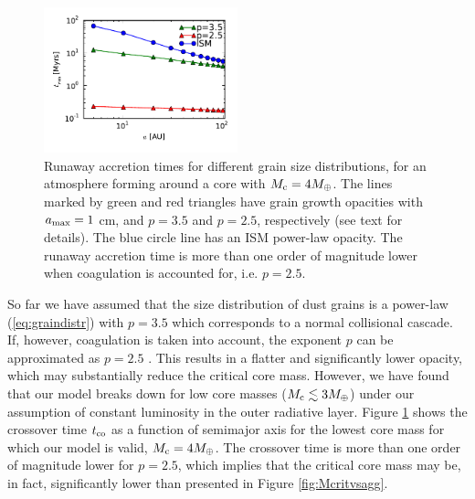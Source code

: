 \documentclass[apj]{emulateapj}
\newcommand{\co}{_{\rm c}}
\begin{document}
\begin{figure}[h!]
\centering
\includegraphics[width=0.5\textwidth]{../../figs/ModelAtmospheres/RadSelfGravRealEOS/PaperFigs/tco_vs_a_Mc4_comp.pdf}
\caption{Runaway accretion times for different grain size distributions, for an atmosphere forming around a core with $M\co=4 M_{\oplus}$. The lines marked by green and red triangles have grain growth opacities with $a_{\rm max}=1$ cm, and $p=3.5$ and $p=2.5$, respectively (see text for details). The blue circle line has an ISM power-law opacity. The runaway accretion time is more than one order of magnitude lower when coagulation is accounted for, i.e. $p=2.5$.}
\label{fig:p25p35}
\end{figure}

So far we have assumed that the size distribution of dust grains is a power-law (\ref{eq:graindistr}) with $p=3.5$ which corresponds to a normal collisional cascade. If, however, coagulation is taken into account, the exponent $p$ can be approximated as $p=2.5$ \citep{dalessio01}. This results in a flatter and significantly lower opacity, which may substantially reduce the critical core mass. However, we have found that our model breaks down for low core masses ($M\co \lesssim 3 M_{\oplus}$) under our assumption of constant luminosity in the outer radiative layer. Figure \ref{fig:p25p35} shows the crossover time $t_{\rm co}$ as a function of semimajor axis for the lowest core mass for which our model is valid, $M\co=4 M_{\oplus}$. The crossover time is more than one order of magnitude lower for $p=2.5$, which implies that the critical core mass may be, in fact, significantly lower than presented in Figure \ref{fig:Mcritvsagg}.
\end{document}

